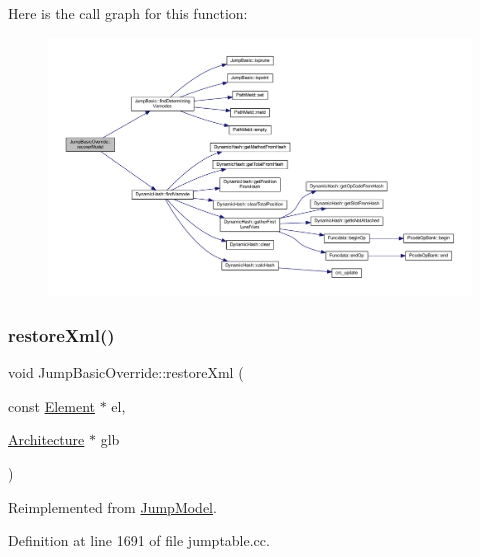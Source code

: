Here is the call graph for this function\+:
\nopagebreak
\begin{figure}[H]
\begin{center}
\leavevmode
\includegraphics[width=350pt]{class_jump_basic_override_a4fd706bf7ee1023bd1d93c78ba66852f_cgraph}
\end{center}
\end{figure}
\mbox{\label{class_jump_basic_override_afc4f40d7eaff7e5a25804dc57323b9db}} 
\subsubsection{\texorpdfstring{restoreXml()}{restoreXml()}}
{\footnotesize\ttfamily void Jump\+Basic\+Override\+::restore\+Xml (\begin{DoxyParamCaption}\item[{const \mbox{\hyperlink{class_element}{Element}} $\ast$}]{el,  }\item[{\mbox{\hyperlink{class_architecture}{Architecture}} $\ast$}]{glb }\end{DoxyParamCaption})\hspace{0.3cm}{\ttfamily [virtual]}}



Reimplemented from \mbox{\hyperlink{class_jump_model_ac0acbb92da0d5b490271a5a87f54dd00}{Jump\+Model}}.



Definition at line 1691 of file jumptable.\+cc.

